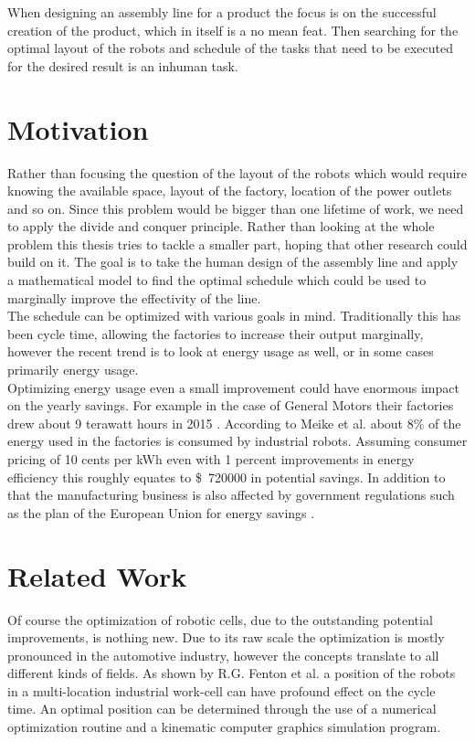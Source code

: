 When designing an assembly line for a product the focus is on the successful creation of the product, which in itself is a no mean feat. Then searching for the optimal layout of the robots and schedule of the tasks that need to be executed for the desired result is an inhuman task. 

\section{Motivation}

Rather than focusing the question of the layout of the robots which would require knowing the available space, layout of the factory, location of the power outlets and so on. Since this problem would be bigger than one lifetime of work, we need to apply the divide and conquer principle. Rather than looking at the whole problem this thesis tries to tackle a smaller part, hoping that other research could build on it. The goal is to take the human design of the assembly line and apply a mathematical model to find the optimal schedule which could be used to marginally improve the effectivity of the line. \\

The schedule can be optimized with various goals in mind. Traditionally this has been cycle time, allowing the factories to increase their output marginally, however the recent trend is to look at energy usage as well, or in some cases primarily energy usage.\\

Optimizing energy usage even a small improvement could have enormous impact on the yearly savings. For example in the case of General Motors their factories drew about 9 terawatt hours in 2015 \cite{GMEnergySpending}. According to Meike et al. \cite{Meike8Percent} about 8\% of the energy used in the factories is consumed by industrial robots. Assuming consumer pricing of 10 cents per kWh even with 1 percent improvements in energy efficiency this roughly equates to \$~720000 in potential savings. In addition to that the manufacturing business is also affected by government regulations such as the plan of the European Union for energy savings \cite{EUElectricity}.

\section{Related Work}

Of course the optimization of robotic cells, due to the outstanding potential improvements, is nothing new. Due to its raw scale the optimization is mostly pronounced in the automotive industry, however the concepts translate to all different kinds of fields. As shown by R.G. Fenton et al. \cite{OptimizationCycleTimeFenton} a position of the robots in a multi-location industrial work-cell can have profound effect on the cycle time. An optimal position  can be determined through the use of a numerical optimization routine and a kinematic computer graphics simulation program. \\

